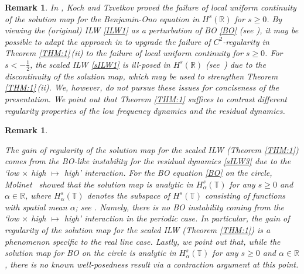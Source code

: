 \documentclass[letterpaper, 11pt,  reqno]{amsart}
\newtheorem{remark}[theorem]{Remark}
\newcommand{\1}{\hspace{0.5mm}\textup{I}\hspace{0.5mm}}
\newcommand{\R}{\mathbb{R}}
\newcommand{\T}{\mathbb{T}}
\newcommand{\al}{\alpha}
\numberwithin{equation}{section}
\numberwithin{theorem}{section}
\begin{document}
\begin{remark}\rm
In \cite{KTz2}, 
Koch and Tzvetkov 
proved 
the failure of local uniform continuity
of the solution map 
for the Benjamin-Ono equation
in $H^s(\R)$
for $s \ge 0$.
By viewing the (original) ILW \eqref{ILW1}
as a perturbation of BO \eqref{BO}
(see \cite{IS, CLOP}), 
it may be possible to  adapt the approach in 
 \cite{KTz2}
to upgrade the failure of $C^2$-regularity 
in Theorem \ref{THM:1}\,(ii)
to  the failure of local uniform continuity
for $s \ge 0$.
For $s < - \frac 12$, the scaled ILW \eqref{sILW1}
is ill-posed in $H^s(\R)$ (see~\cite{CFLOP})
due to the discontinuity of the solution map, 
which may be used to strengthen
Theorem \ref{THM:1}\,(ii).
We, however, do not pursue these issues
for conciseness of the presentation.
We point out that Theorem \ref{THM:1}
suffices to contrast 
different regularity properties
of the low frequency dynamics
and the residual dynamics.


\end{remark}



\begin{remark}\label{REM:circle}\rm

The gain of regularity of the solution map 
for the scaled ILW (Theorem \ref{THM:1})
comes from the BO-like instability 
for the residual dynamics \eqref{sILW3}
due to the `low $\times$ high $\mapsto$ high' interaction.
For the BO equation \eqref{BO}
on the circle, 
Molinet~\cite{Moli2} showed that the solution map
is  analytic
in $H^s_\al(\T)$
for any $s \ge 0$ and $\al \in \R$, 
where 
$H^s_\al(\T)$
denotes the subspace of  $H^s(\T)$
consisting of functions with spatial mean $\al$;
see
\cite[Theorem~1.2]{Moli2}.
Namely, there is no BO instability 
coming from 
the `low $\times$ high $\mapsto$ high' interaction
in the periodic case.
In particular,
the gain of regularity of the solution map 
for the scaled ILW (Theorem \ref{THM:1})
is 
a phenomenon specific to  the real line case.
Lastly, we point out that, 
while the  solution map for BO on the circle is
analytic in $H^s_\al(\T)$ for any $s \ge 0$ and $\al \in \R$, 
 there is no known well-posedness result  via a contraction argument
at this point. 

\end{remark}
\end{document}

